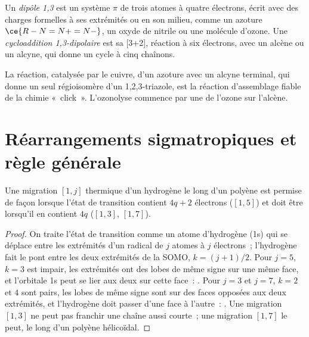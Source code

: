 \begin{definition}\label{def:b3:pericyclic:dipolar}
Un \emph{dipôle 1,3} est un système $\pi$ de trois atomes à quatre
électrons, écrit avec des charges formelles à ses extrémités ou en son
milieu, comme un azoture $\ce{R-N=N+=N-}$, un oxyde de nitrile ou une molécule d'ozone. Une
\emph{cycloaddition 1,3-dipolaire} est sa
 [3+2], réaction à six électrons, avec un alcène ou un alcyne,
qui donne un cycle à cinq chaînons.
\end{definition}

La réaction, catalysée par le cuivre, d'un azoture avec un alcyne terminal,
qui donne un seul régioisomère d'un 1,2,3-triazole, est la réaction
d'assemblage fiable de la chimie «~click~». L'ozonolyse commence par une
 de l'ozone sur l'alcène.

\section{Réarrangements sigmatropiques et règle générale}

\begin{proposition}\label{prop:b3:pericyclic:sigmatropic-h}
Une migration $[1, j]$ thermique d'un hydrogène le long d'un polyène est permise de façon  lorsque
l'état de transition contient $4q + 2$ électrons ($[1,5]$) et doit être  lorsqu'il en contient $4q$
($[1,3]$, $[1,7]$).
\end{proposition}

\begin{proof}
On traite l'état de transition comme un atome d'hydrogène (1s) qui se
déplace entre les extrémités d'un
radical de $j$ atomes à $j$ électrons~; l'hydrogène fait le pont entre les deux extrémités de la
SOMO, $k = (j + 1)/2$. Pour $j = 5$, $k = 3$ est impair, les extrémités ont des lobes de même signe sur une même face,
et l'orbitale 1s peut se lier aux deux sur cette face~: . Pour $j = 3$ et $j = 7$,
$k = 2$ et $4$ sont pairs, les lobes de même signe sont sur des faces opposées aux deux extrémités, et
l'hydrogène doit passer d'une face à l'autre~: . Une migration $[1,3]$
ne peut pas franchir une chaîne aussi courte~; une migration $[1,7]$ le peut, le long d'un polyène hélicoïdal.
\end{proof}

